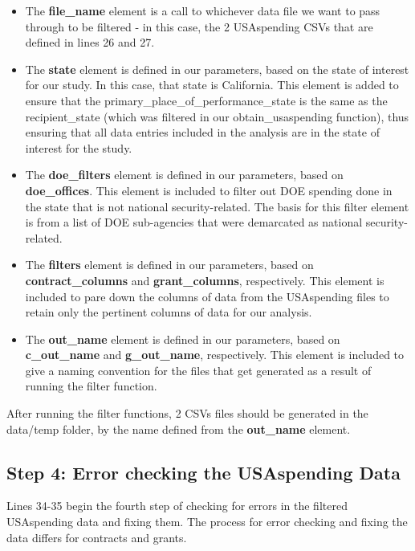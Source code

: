 \documentclass[
]{book}
\providecommand{\tightlist}{%
  \setlength{\itemsep}{0pt}\setlength{\parskip}{0pt}}
\begin{document}
\begin{itemize}
\tightlist
\item
  The \textbf{file\_name} element is a call to whichever data file we want to pass through to be filtered - in this case, the 2 USAspending CSVs that are defined in lines 26 and 27.
\item
  The \textbf{state} element is defined in our parameters, based on the state of interest for our study. In this case, that state is California. This element is added to ensure that the primary\_place\_of\_performance\_state is the same as the recipient\_state (which was filtered in our obtain\_usaspending function), thus ensuring that all data entries included in the analysis are in the state of interest for the study.
\item
  The \textbf{doe\_filters} element is defined in our parameters, based on \textbf{doe\_offices}. This element is included to filter out DOE spending done in the state that is not national security-related. The basis for this filter element is from a list of DOE sub-agencies that were demarcated as national security-related.
\item
  The \textbf{filters} element is defined in our parameters, based on \textbf{contract\_columns} and \textbf{grant\_columns}, respectively. This element is included to pare down the columns of data from the USAspending files to retain only the pertinent columns of data for our analysis.
\item
  The \textbf{out\_name} element is defined in our parameters, based on \textbf{c\_out\_name} and \textbf{g\_out\_name}, respectively. This element is included to give a naming convention for the files that get generated as a result of running the filter function.
\end{itemize}

After running the filter functions, 2 CSVs files should be generated in the data/temp folder, by the name defined from the \textbf{out\_name} element.

\hypertarget{step-4-error-checking-the-usaspending-data}{%
\subsection{Step 4: Error checking the USAspending Data}\label{step-4-error-checking-the-usaspending-data}}

Lines 34-35 begin the fourth step of checking for errors in the filtered USAspending data and fixing them. The process for error checking and fixing the data differs for contracts and grants.
\end{document}
